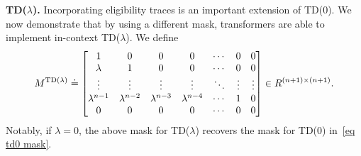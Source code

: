 \documentclass{article}
\newcommand{\tb}[1]{{\textbf{#1}}}
\newcommand{\attn}{\text{LinAttn}}
\newcommand{\tf}{\text{TF}}
\newcommand{\tdlambda}{\text{TD($\lambda$)}}
\begin{document}
\tb{TD($\lambda$).}
Incorporating eligibility traces is an important extension of TD(0).
We now demonstrate that by using a different mask,
transformers are able to implement in-context TD($\lambda$).
We define
\begin{align}
    M^\tdlambda \doteq 
    \mqty[1 & 0 & 0 & 0 & \cdots & 0 & 0\\
    \lambda & 1 & 0 & 0 & \cdots & 0 & 0\\
    \vdots & \vdots & \vdots & \vdots & \ddots & \vdots & \vdots\\
    \lambda^{n-1} & \lambda^{n-2} & \lambda^{n-3} & \lambda^{n-4} & \cdots & 1 & 0\\
    0 & 0 & 0 & 0 & \cdots & 0 & 0] \in R^{(n+1)\times(n+1)}. \label{eq: td lambda mask}
\end{align}
Notably, if $\lambda = 0$, the above mask for TD($\lambda$) recovers the mask for TD(0) in~\eqref{eq td0 mask}.
\end{document}

